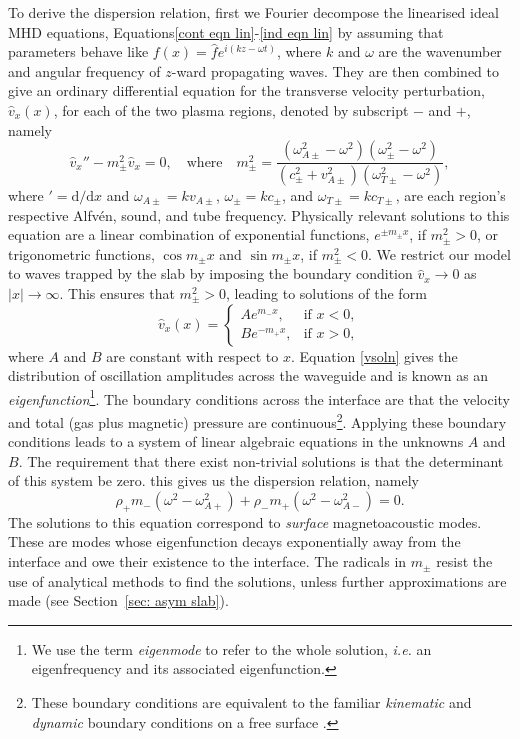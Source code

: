 \documentclass[12pt]{../style-files/ociamthesis}
\begin{document}
To derive the dispersion relation, first we Fourier decompose the linearised ideal MHD equations, Equations\eqref{cont eqn lin}-\eqref{ind eqn lin} by assuming that parameters behave like $f(x) = \hat{f}e^{i(kz - \omega t)}$, where $k$ and $\omega$ are the wavenumber and angular frequency of $z$-ward propagating waves. They are then combined to give an ordinary differential equation for the transverse velocity perturbation, $\hat{v}_x(x)$, for each of the two plasma regions, denoted by subscript $-$ and $+$, namely
\begin{equation}
\hat{v}_x'' - m_\pm^2\hat{v}_x = 0, \quad \text{where} \quad
m_\pm^2 = \frac{(\omega_{A\pm}^2 - \omega^2)(\omega_\pm^2 - \omega^2)}{(c_\pm^2 + v_{A\pm}^2)(\omega_{T\pm}^2 - \omega^2)},
\end{equation}
where $'=\textrm{d}/\textrm{d}x$ and $\omega_{A\pm} = kv_{A\pm}$, $\omega_{\pm} = kc_{\pm}$, and $\omega_{T\pm} = kc_{T\pm}$, are each region's respective Alfv\'{e}n, sound, and tube frequency. Physically relevant solutions to this equation are a linear combination of exponential functions, $e^{\pm m_\pm x}$, if $m_\pm^2 > 0$, or trigonometric functions, $\cos{m_\pm x}$ and $\sin{m_\pm x}$, if $m_\pm^2 < 0$. We restrict our model to waves trapped by the slab by imposing the boundary condition $\hat{v}_x \to 0$ as $|x| \to \infty$. This ensures that $m_\pm^2 > 0$, leading to solutions of the form
\begin{equation}
\hat{v}_x(x)=
\begin{cases}
Ae^{m_-x}, & \text{if } x < 0, \\
Be^{-m_+x}, & \text{if } x > 0,
\end{cases} \label{vsoln}
\end{equation}
where $A$ and $B$ are constant with respect to $x$. Equation \eqref{vsoln} gives the distribution of oscillation amplitudes across the waveguide and is known as an \textit{eigenfunction}\footnote{We use the term \textit{eigenmode} to refer to the whole solution, \textit{i.e.} an eigenfrequency and its associated eigenfunction.}. The boundary conditions across the interface are that the velocity and total (gas plus magnetic) pressure are continuous\footnote{These boundary conditions are equivalent to the familiar \textit{kinematic} and \textit{dynamic} boundary conditions on a free surface \cite{goe_etal04}.}. Applying these boundary conditions leads to a system of linear algebraic equations in the unknowns $A$ and $B$. The requirement that there exist non-trivial solutions is that the determinant of this system be zero. this gives us the dispersion relation, namely
\begin{equation}
	\rho_+m_-(\omega^2 - \omega_{A+}^2) + \rho_-m_+(\omega^2 - \omega_{A-}^2) = 0. \label{DR interface}
\end{equation}
The solutions to this equation correspond to \textit{surface} magnetoacoustic modes. These are modes whose eigenfunction decays exponentially away from the interface and owe their existence to the interface. The radicals in $m_\pm$ resist the use of analytical methods to find the solutions, unless further approximations are made (see Section~\ref{sec: asym slab}).
\end{document}
